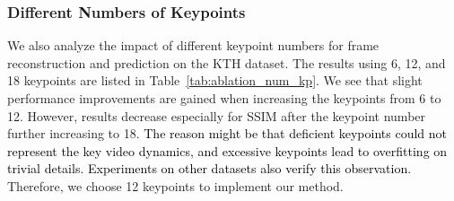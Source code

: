 \documentclass[letterpaper, 10 pt, conference]{ieeeconf}
\newcommand{\gao}[1]{{\textcolor{black}{#1}}}
\begin{document}
\begin{table}[t]
	\centering
	\caption{Ablative testing results for different number of keypoints.}
	\label{tab:ablation_num_kp}
	\vspace{-1mm}
\end{table}






\subsubsection{Different Numbers of Keypoints}
\label{sec:ablation_num}
We also analyze the impact of different keypoint numbers for frame reconstruction and prediction on the KTH dataset.
The results using 6, 12, and 18 keypoints are listed in Table~\ref{tab:ablation_num_kp}.
We see that slight performance improvements are gained when increasing the keypoints from 6 to 12.
However, results decrease especially for SSIM after the keypoint number further increasing to 18. 
\gao{The reason might be that deficient keypoints could not represent the key video dynamics, and excessive keypoints lead to overfitting on trivial details. 
Experiments on other datasets also verify this observation.}
Therefore, we choose 12 keypoints to implement our method. 
\end{document}
